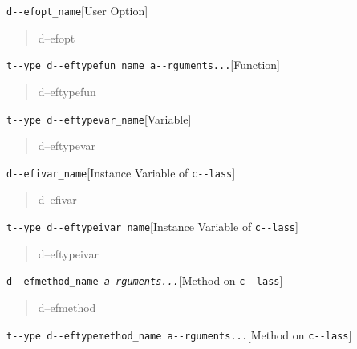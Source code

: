 \documentclass{book}
\begin{document}
\noindent\texttt{d{-}{-}efopt\_name}\hfill[User Option]



%
\begin{quote}
d--efopt
\end{quote}

\noindent\texttt{t{-}{-}ype d{-}{-}eftypefun\_name a{-}{-}rguments...}\hfill[Function]



%
\begin{quote}
d--eftypefun
\end{quote}

\noindent\texttt{t{-}{-}ype d{-}{-}eftypevar\_name}\hfill[Variable]



%
\begin{quote}
d--eftypevar
\end{quote}

\noindent\texttt{d{-}{-}efivar\_name}\hfill[Instance Variable of \texttt{c{-}{-}lass}]



%
\begin{quote}
d--efivar
\end{quote}

\noindent\texttt{t{-}{-}ype d{-}{-}eftypeivar\_name}\hfill[Instance Variable of \texttt{c{-}{-}lass}]



%
\begin{quote}
d--eftypeivar
\end{quote}

\noindent\texttt{d{-}{-}efmethod\_name \EmbracOn{}\textnormal{\textsl{a--rguments...}}\EmbracOff{}}\hfill[Method on \texttt{c{-}{-}lass}]



%
\begin{quote}
d--efmethod
\end{quote}

\noindent\texttt{t{-}{-}ype d{-}{-}eftypemethod\_name a{-}{-}rguments...}\hfill[Method on \texttt{c{-}{-}lass}]
\end{document}
